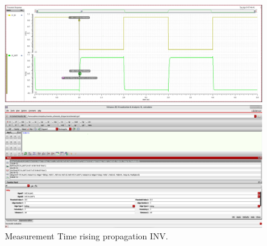 \begin{figure}[H]
	\begin{minipage}{0.5\linewidth}
		\includegraphics[width=\linewidth]{section/EX1/INV/EX1_INV_Tpdr_Waveform.png}
	\end{minipage}
	\begin{minipage}{0.5\linewidth}
		\includegraphics[width=\linewidth]{section/EX1/INV/EX1_INV_Tpdr_Cal.png}
	\end{minipage}
	\caption{Measurement Time rising propagation INV.}
\end{figure}

